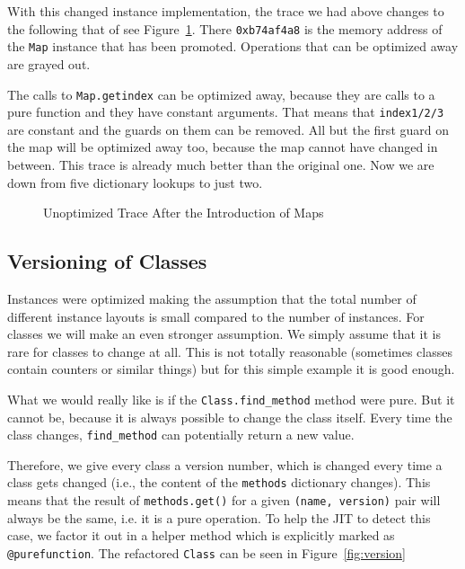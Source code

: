 \documentclass{sigplanconf}
\begin{document}
With this changed instance implementation, the trace we had above changes to the
following that of see Figure~\ref{fig:trace2}. There \texttt{0xb74af4a8} is the
memory address of the \texttt{Map} instance that has been promoted. Operations
that can be optimized away are grayed out.

The calls to \texttt{Map.getindex} can be optimized away, because they are calls to
a pure function and they have constant arguments. That means that \texttt{index1/2/3}
are constant and the guards on them can be removed. All but the first guard on
the map will be optimized away too, because the map cannot have changed in
between. This trace is already much better than
the original one. Now we are down from five dictionary lookups to just two.

\begin{figure}

\caption{Unoptimized Trace After the Introduction of Maps}
\label{fig:trace2}
\end{figure}





\subsection{Versioning of Classes}

Instances were optimized making the assumption that the total number of
different instance layouts is small compared to the number of instances. For classes we
will make an even stronger assumption. We simply assume that it is rare for
classes to change at all. This is not totally reasonable (sometimes classes contain
counters or similar things) but for this simple example it is good enough.

What we would really like is if the \texttt{Class.find\_method} method were pure.
But it cannot be, because it is always possible to change the class itself.
Every time the class changes, \texttt{find\_method} can potentially return a
new value.

Therefore, we give every class a version number, which is changed every time a
class gets changed (i.e., the content of the \texttt{methods} dictionary changes).
This means that the result of \texttt{methods.get()} for a given \texttt{(name,
version)} pair will always be the same, i.e. it is a pure operation.  To help
the JIT to detect this case, we factor it out in a helper method which is
explicitly marked as \texttt{@purefunction}. The refactored \texttt{Class} can
be seen in Figure~\ref{fig:version}
\end{document}
